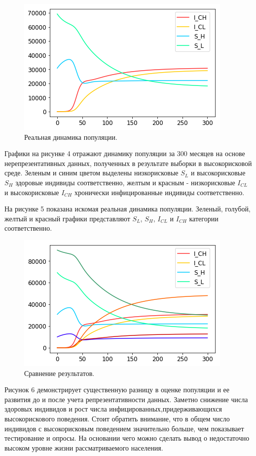 \documentclass[a4paper]{report}
\begin{document}
	\begin{figure}[h!]
		\includegraphics{im3}
		\caption{Реальная динамика популяции.}
	\end{figure}
	
	Графики на рисунке 4 отражают динамику популяции за 300 месяцев на основе нерепрезентативных данных, полученных в результате выборки в высокорисковой среде. 
	Зеленым и синим цветом выделены низкорисковые $S_L$ и высокорисковые $S_H$ здоровые индивиды соответственно, желтым и красным - низкорисковые $I_{CL}$ и высокорисковые $I_{CH}$ хронически инфицированные индивиды соответственно.
	
	На рисунке 5 показана искомая реальная динамика популяции. Зеленый, голубой, желтый и красный графики представляют $S_L$, $S_H$, $I_{CL}$ и $I_{CH}$ категории соответственно.
	
	\begin{figure}[h!]
	\includegraphics{im2}
	\caption{Сравнение результатов.}	
	\end{figure}

	Рисунок 6 демонстрирует существенную разницу в оценке популяции и ее развития до и после учета репрезентативности данных. Заметно снижение числа здоровых индивидов и рост числа инфицированных,придерживающихся высокорискового поведения. Стоит обратить внимание, что в общем число индивидов с высокорисковым поведением значительно больше, чем показывает тестирование и опросы. На основании чего можно сделать вывод о недостаточно высоком уровне жизни рассматриваемого населения.
	
\end{document}
